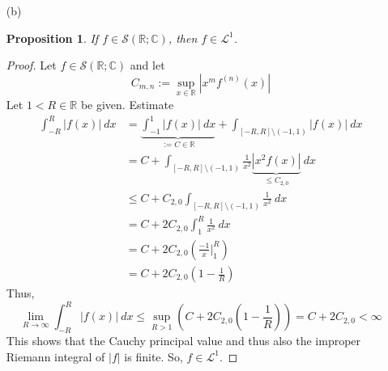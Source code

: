 \documentclass[12pt, reqno]{amsart}
\newtheorem{prop}{Proposition}[section]
\theoremstyle{definition}
\theoremstyle{remark}
\newcommand{\ud}{\mathrm{d}}
\begin{document}
\begin{itemize}
\begin{itemize}

\vspace{0.1 cm}
\item[(b)] 

\begin{prop}
    If $f\in\mathcal{S}(\mathbb{R;C})$, then $f\in\mathcal{L}^1$.
\end{prop}


\begin{proof}
    Let $f\in\mathcal{S}(\mathbb{R};\mathbb{C})$ and let $$C_{m,n}:=\sup_{x\in \mathbb{R}}|x^{m}f^{(n)}(x)|$$
Let $1<R\in \mathbb{R}$ be given. Estimate \begin{align*}
\int_{-R}^{R}|f(x)|\ dx&= \underbrace{\int_{-1}^{1}|f(x)|\ dx}_{:=C\in \mathbb{R}}+\int_{[-R,R]\setminus(-1,1)}|f(x)|\ dx\\
&= C+\int_{[-R,R]\setminus(-1,1)} \frac{1}{x^{2}}\underbrace{|x^{2}f(x)|}_{\le C_{2,0}}\ dx\\
&\le C+ C_{2,0}\int_{[-R,R]\setminus(-1,1)} \frac{1}{x^{2}}\ dx\\
&= C+2C_{2,0}\int_{1}^{R} \frac{1}{x^{2}}\ dx\\
&= C+2C_{2,0} \left(\frac{-1}{x}\bigg|_{1}^{R}\right)\\
&= C+ 2C_{2,0}\left(1- \frac{1}{R}\right)
\end{align*}
Thus, $$\lim_{R\rightarrow \infty}\int_{-R}^{R}|f(x)|\ dx\le\sup_{R>1}\left(C+2C_{2,0}\left(1- \frac{1}{R}\right)\right)= C+2C_{2,0}<\infty$$
This shows that the Cauchy principal value and thus also the improper Riemann integral of $|f|$ is finite. So, $f\in\mathcal{L}^{1}$.
\end{proof}


\end{itemize}
\end{itemize}
\end{document}

